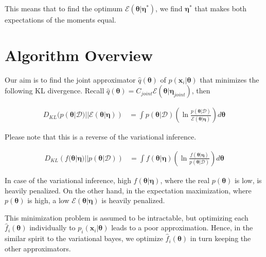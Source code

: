 \documentclass[a4]{article}
\begin{document}
This means that to find the optimum $\mathcal{E}(\bm{\theta}|\bm{\eta}^*)$, we find $\bm{\eta}^*$ that makes
both expectations of the moments equal.









\section{Algorithm Overview}
Our aim is to find the joint approximator $\hat{q}(\bm{\theta})$ of $p(\bm{x}_i|\bm{\theta})$ that minimizes
the following KL divergence.
Recall $\hat{q}(\bm{\theta})=C_{joint}\mathcal{E}(\bm{\theta} | \bm{\eta}_{joint})$, then

\begin{equation}
\begin{aligned}
D_{KL}(p\left(\bm{\theta}|\mathcal{D})||\mathcal{E}(\bm{\theta}|\bm{\eta})\right) &=
\int p\left(\bm{\theta}|\mathcal{D}\right)
\left( \ln \frac{ p\left(\bm{\theta}|\mathcal{D}\right)} { \mathcal{E}(\bm{\theta}|\bm{\eta})}\right)d\bm{\theta}
\end{aligned}
\end{equation}

Please note that this is a reverse of the variational inference.

\begin{equation}
\begin{aligned}
D_{KL}\left(
f(\bm{\theta}|\bm{\eta})
||
p(\bm{\theta}|\mathcal{D})
\right)
&=
\int
f(\bm{\theta}|\bm{\eta})
\left( \ln \frac{ 
f(\bm{\theta}|\bm{\eta})
} {
p\left(\bm{\theta}|\mathcal{D}\right)
}\right)d\bm{\theta}
\end{aligned}
\end{equation}

In case of the variational inference, high $f(\bm{\theta}|\bm{\eta})$, where the real $p(\bm{\theta})$ is low,
is heavily penalized.
On the other hand, in the expectation maximization, where $p(\bm{\theta})$ is high,
a low $\mathcal{E}(\bm{\theta}|\bm{\eta})$ is heavily penalized.

This minimization problem is assumed to be intractable, but optimizing each $\hat{f}_i(\bm{\theta})$
individually to $p_i(\bm{x}_i|\bm{\theta})$ leads to a poor approximation.
Hence, in the similar spirit to the variational bayes, we optimize $\hat{f}_i(\bm{\theta})$ in turn
keeping the other approximators.
\end{document}
